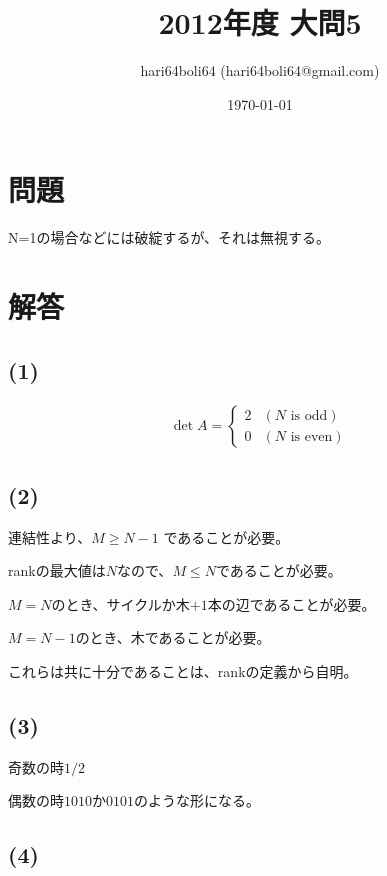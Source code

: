 \documentclass[a4paper, 10pt, dvipdfmx]{jlreq}
\begin{document}
\title{2012年度 大問5}
\author{hari64boli64 (hari64boli64@gmail.com)}
\date{\today}
\maketitle

\section{問題}

N=1の場合などには破綻するが、それは無視する。

\section{解答}

\subsection*{(1)}

\begin{align*}
  \det A=\begin{cases}
           2 & (N \text{ is odd})  \\
           0 & (N \text{ is even})
         \end{cases}
\end{align*}

\subsection*{(2)}

連結性より、$M \geq N - 1$ であることが必要。

rankの最大値は$N$なので、$M \leq N$であることが必要。

$M=N$のとき、サイクルか木$+1$本の辺であることが必要。

$M=N-1$のとき、木であることが必要。

これらは共に十分であることは、rankの定義から自明。

\subsection*{(3)}

奇数の時$1/2$

偶数の時$1010$か$0101$のような形になる。

\subsection*{(4)}
\end{document}
